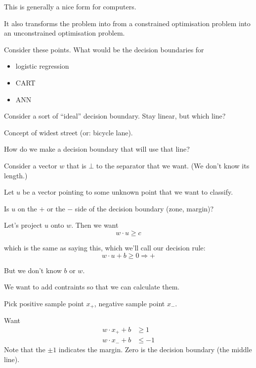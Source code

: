 This is generally a nice form for computers.

It also transforms the problem into from a constrained optimisation
problem into an unconstrained optimisation problem.



Consider these points.  What would be the decision boundaries for
\begin{itemize}
\item logistic regression
\item CART
\item ANN
\end{itemize}

\centerline{}

\bigskip

Consider a sort of ``ideal'' decision boundary.  Stay linear, but
which line?

Concept of widest street (or: bicycle lane).

How do we make a decision boundary that will use that line?

\bigskip
\centerline{}
\bigskip

Consider a vector $w$ that is $\bot$ to the separator that we want.
(We don't know its length.)

Let $u$ be a vector pointing to some unknown point that we want to
classify.

Is $u$ on the $+$ or the $-$ side of the decision boundary (zone, margin)?

Let's project $u$ onto $w$.  Then we want
\begin{displaymath}
  w\cdot u \ge c
\end{displaymath}

which is the same as saying this, which we'll call our decision rule:
\begin{equation}
  \label{eq:decision-rule}
  \boxed{w\cdot u + b \ge 0 \Rightarrow +}
\end{equation}

But we don't know $b$ or $w$.

We want to add contraints so that we can calculate them.

Pick positive sample point $x_+$, negative sample point $x_-$.

Want
\begin{align*}
  w\cdot x_+ + b & \ge 1
  \\
  w\cdot x_- + b & \le -1
\end{align*}
Note that the $\pm 1$ indicates the margin.  Zero is the decision
boundary (the middle line).


